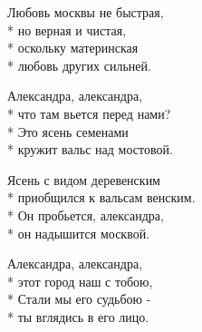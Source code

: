 \begin{minipage}{\linewidth}
Любовь москвы не быстрая,\\*
но верная и чистая, \\*
оскольку материнская\\*
любовь других сильней.\\
\end{minipage}\par\medskip\nobreak

\medskip

\begin{minipage}{\linewidth}
\hspace*{1.5em}Александра, александра,\\*
\hspace*{1.5em}что там вьется перед нами?\\*
\hspace*{1.5em}Это ясень семенами\\*
\hspace*{1.5em}кружит вальс над мостовой.\\
\end{minipage}\par\medskip\nobreak

\medskip

\begin{minipage}{\linewidth}
\hspace*{1.5em}Ясень с видом деревенским\\*
\hspace*{1.5em}приобщился к вальсам венским.\\*
\hspace*{1.5em}Он пробьется, александра,\\*
\hspace*{1.5em}он надышится москвой.\\
\end{minipage}\par\medskip\nobreak

\medskip

\begin{minipage}{\linewidth}
\hspace*{1.5em}Александра, александра,\\*
\hspace*{1.5em}этот город наш с тобою,\\*
\hspace*{1.5em}Стали мы его судьбою -\\*
\hspace*{1.5em}ты вглядись в его лицо.\\
\end{minipage}\par\medskip\nobreak

